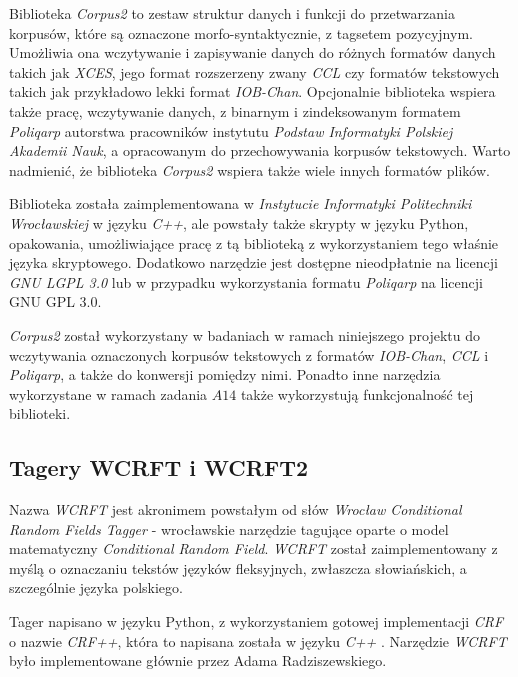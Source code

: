 \documentclass[11pt,a4paper]{llncs}
\begin{document}
Biblioteka \emph{Corpus2} to zestaw struktur danych i funkcji do przetwarzania korpusów, które są oznaczone morfo-syntaktycznie, z tagsetem pozycyjnym. 
Umożliwia ona wczytywanie i zapisywanie danych do różnych formatów danych takich jak \emph{XCES}, jego format rozszerzeny zwany \emph{CCL} czy formatów tekstowych takich jak przykładowo lekki format \emph{IOB-Chan}.
Opcjonalnie biblioteka wspiera także pracę, wczytywanie danych, z binarnym i zindeksowanym formatem \emph{Poliqarp} autorstwa pracowników instytutu \emph{Podstaw Informatyki Polskiej Akademii Nauk}, a opracowanym do przechowywania korpusów tekstowych.
Warto nadmienić, że biblioteka \emph{Corpus2} wspiera także wiele innych formatów plików.


 
Biblioteka została zaimplementowana w \emph{Instytucie Informatyki Politechniki Wrocławskiej} w języku \emph{C++}, ale powstały także skrypty w języku Python, opakowania, umożliwiające pracę z tą biblioteką z wykorzystaniem tego właśnie języka skryptowego.
Dodatkowo narzędzie jest dostępne nieodpłatnie na licencji \emph{GNU LGPL 3.0} lub w przypadku wykorzystania formatu \emph{Poliqarp} na licencji GNU GPL 3.0.



\emph{Corpus2} został wykorzystany w badaniach w ramach niniejszego projektu do wczytywania oznaczonych korpusów tekstowych z formatów \emph{IOB-Chan}, \emph{CCL} i \emph{Poliqarp}, a także do konwersji pomiędzy nimi.
Ponadto inne narzędzia wykorzystane w ramach zadania $A14$ także wykorzystują funkcjonalność tej biblioteki.


\subsection{Tagery WCRFT i WCRFT2}

Nazwa \emph{WCRFT} jest akronimem powstałym od słów \emph{Wrocław Conditional Random Fields Tagger} - wrocławskie narzędzie tagujące oparte o model matematyczny \emph{Conditional Random Field}.
\emph{WCRFT} został zaimplementowany z myślą o oznaczaniu tekstów języków fleksyjnych, zwłaszcza słowiańskich, a szczególnie języka polskiego.


Tager napisano w języku Python, z wykorzystaniem gotowej implementacji \emph{CRF} o nazwie \emph{CRF++}, która to napisana została w języku \emph{C++} \cite{wcrft}.
Narzędzie \emph{WCRFT} było implementowane głównie przez Adama Radziszewskiego.
\end{document}
